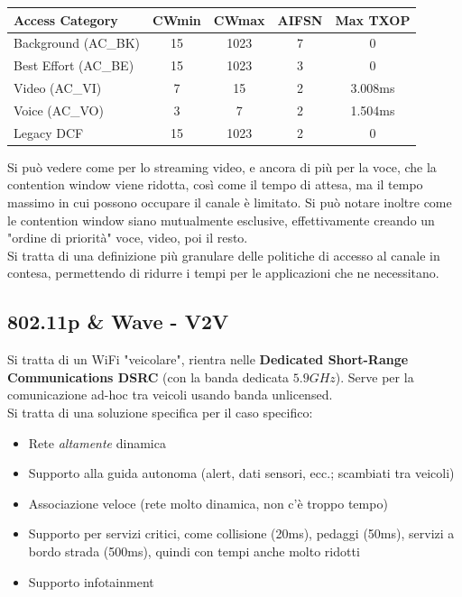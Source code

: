 \begin{tabular}{|l|c|c|c|c|}
	\hline
	\textbf{Access Category} & \textbf{CWmin} & \textbf{CWmax} & \textbf{AIFSN} & \textbf{Max TXOP} \\ 
	\hline
	Background (AC\_BK) & 15 & 1023 & 7 & 0 \\ 
	\hline
	Best Effort (AC\_BE) & 15 & 1023 & 3 & 0 \\ 
	\hline
	Video (AC\_VI) & 7 & 15 & 2 & 3.008ms \\ 
	\hline
	Voice (AC\_VO) & 3 & 7 & 2 & 1.504ms \\ 
	\hline
	Legacy DCF & 15 & 1023 & 2 & 0 \\ 
	\hline
\end{tabular}

Si può vedere come per lo streaming video, e ancora di più per la voce, che la contention window viene ridotta, così come il tempo di attesa, ma il tempo massimo in cui possono occupare il canale è limitato. Si può notare inoltre come le contention window siano mutualmente esclusive, effettivamente creando un "ordine di priorità" voce, video, poi il resto.\\

Si tratta di una definizione più granulare delle politiche di accesso al canale in contesa, permettendo di ridurre i tempi per le applicazioni che ne necessitano.\\


\subsection{802.11p \& Wave - V2V}

Si tratta di un WiFi "veicolare", rientra nelle \textbf{Dedicated Short-Range Communications DSRC} (con la banda dedicata $5.9GHz$). Serve per la comunicazione ad-hoc tra veicoli usando banda unlicensed.\\

Si tratta di una soluzione specifica per il caso specifico: 
\begin{itemize}
	\item Rete \textit{altamente} dinamica
	\item Supporto alla guida autonoma (alert, dati sensori, ecc.; scambiati tra veicoli)
	\item Associazione veloce (rete molto dinamica, non c'è troppo tempo)
	\item Supporto per servizi critici, come collisione (20ms), pedaggi (50ms), servizi a bordo strada (500ms), quindi con tempi anche molto ridotti
	\item Supporto infotainment
\end{itemize}

